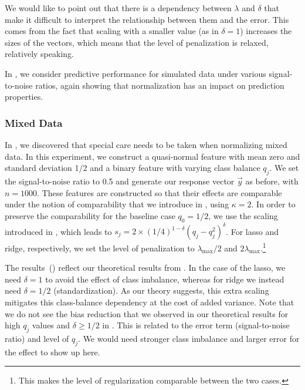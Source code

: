 We would like to point out that there is a dependency between \(\lambda\) and \(\delta\)
that make it difficult to interpret the relationship between them and the error. This comes
from the fact that scaling with a smaller value (as in \(\delta = 1\)) increases the sizes
of the vectors, which means that the level of penalization is relaxed, relatively speaking.

In , we consider predictive performance for simulated data
under various signal-to-noise ratios, again showing that normalization has an impact on
prediction properties.

\subsubsection{Mixed Data}\label{sec:experiments-mixed-data}

In , we discovered that special care needs to be taken when
normalizing mixed data. In this experiment, we construct a quasi-normal feature with mean
zero and standard deviation 1/2 and a binary feature with varying class balance \(q_j\). We
set the signal-to-noise ratio to 0.5 and generate our response vector \(\vec{y}\) as
before, with \(n = \num{1000}\). These features are constructed so that their effects are
comparable under the notion of comparability that we introduce in ,
using \(\kappa = 2\). In order to preserve the comparability for the baseline case \(q_0 =
1/2\), we use the scaling introduced in , which leads to \(s_j = 2
\times (1/4)^{1-\delta}(q_j-q_j^2)^\delta\). For lasso and ridge, respectively, we set the
level of penalization to \(\lambda_\text{max}/2\) and
\(2\lambda_\text{max}\).\footnote{This makes the level of regularization comparable between
  the two cases.}

The results~() reflect our theoretical results from
. In the case of the lasso, we need \(\delta =1\) to avoid the effect of
class imbalance, whereas for ridge we instead need \(\delta =1/2\) (standardization). As
our theory suggests, this extra scaling mitigates this class-balance dependency at the cost
of added variance. Note that we do not see the bias reduction that we observed in our
theoretical results for high \(q_j\) values and \(\delta \geq 1/2\) in
. This is related to the error term (signal-to-noise
ratio) and level of \(q_j\). We would need stronger class imbalance and larger error for
the effect to show up here.

